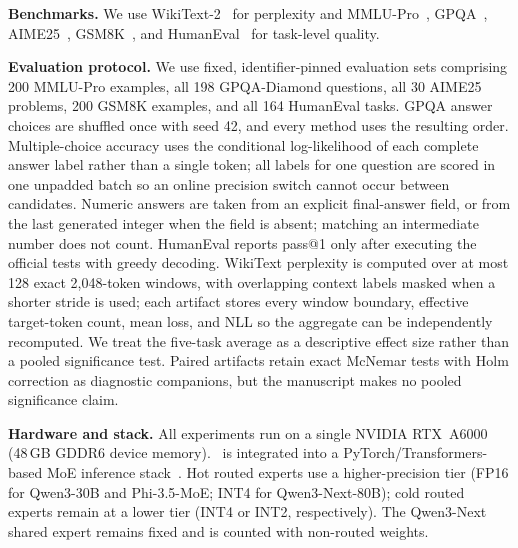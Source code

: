 \noindent\textbf{Benchmarks.}
We use WikiText-2~\cite{merity2016pointer} for perplexity and MMLU-Pro~\cite{wang2024mmlu}, GPQA~\cite{rein2024gpqa}, AIME25~\cite{zhang2025aime25}, GSM8K~\cite{cobbe2021gsm8k}, and HumanEval~\cite{chen2021evaluating} for task-level quality.

\noindent\textbf{Evaluation protocol.}
We use fixed, identifier-pinned evaluation sets comprising 200 MMLU-Pro examples, all 198 GPQA-Diamond questions, all 30 AIME25 problems, 200 GSM8K examples, and all 164 HumanEval tasks. GPQA answer choices are shuffled once with seed 42, and every method uses the resulting order. Multiple-choice accuracy uses the conditional log-likelihood of each complete answer label rather than a single token; all labels for one question are scored in one unpadded batch so an online precision switch cannot occur between candidates. Numeric answers are taken from an explicit final-answer field, or from the last generated integer when the field is absent; matching an intermediate number does not count. HumanEval reports pass@1 only after executing the official tests with greedy decoding. WikiText perplexity is computed over at most 128 exact 2,048-token windows, with overlapping context labels masked when a shorter stride is used; each artifact stores every window boundary, effective target-token count, mean loss, and NLL so the aggregate can be independently recomputed. We treat the five-task average as a descriptive effect size rather than a pooled significance test. Paired artifacts retain exact McNemar tests with Holm correction as diagnostic companions, but the manuscript makes no pooled significance claim.

\noindent\textbf{Hardware and stack.}
All experiments run on a single NVIDIA RTX~A6000 (48\,GB GDDR6 device memory). \systemname\ is integrated into a PyTorch/Transformers-based MoE inference stack~\cite{paszke2019pytorch,wolf2020transformers}. Hot routed experts use a higher-precision tier (FP16 for Qwen3-30B and Phi-3.5-MoE; INT4 for Qwen3-Next-80B); cold routed experts remain at a lower tier (INT4 or INT2, respectively). The Qwen3-Next shared expert remains fixed and is counted with non-routed weights.

